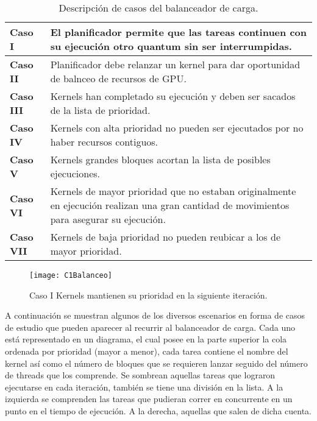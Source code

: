  \begin{table}[!]
      \begin{center}
            \footnotesize
        \begin{tabular}{|m{2cm}|m{8.5cm}|}
         \hline
         \cellcolor{lightgray}\textbf{Caso I} & El planificador permite que las tareas continuen con su ejecución otro quantum sin ser interrumpidas.\\ 
         \hline
          \cellcolor{lightgray}\textbf{Caso II} & Planificador debe relanzar un kernel para dar oportunidad de balnceo de recursos de GPU.\\ 
         \hline  
         \cellcolor{lightgray}\textbf{Caso III} & Kernels han completado su ejecución y deben ser sacados de la lista de prioridad.\\ 
         \hline
         \cellcolor{lightgray}\textbf{Caso IV} & Kernels con alta prioridad no pueden ser ejecutados por no haber recursos contiguos.\\ 
         \hline
         \cellcolor{lightgray}\textbf{Caso V} & Kernels grandes bloques acortan la lista de posibles ejecuciones.\\ 
         \hline
         \cellcolor{lightgray}\textbf{Caso VI} & Kernels de mayor prioridad que no estaban originalmente en ejecución realizan una gran cantidad de movimientos para asegurar su ejecución.\\ 
         \hline
         \cellcolor{lightgray}\textbf{Caso VII} & Kernels de baja prioridad no pueden reubicar a los de mayor prioridad.\\
         \hline
           \end{tabular}
        \caption{Descripción de casos del balanceador de carga.}
        \label{tab:Casos}
      \end{center}
    \end{table}
    

    \begin{figure}[!]
      \centering
        \texttt{[image: C1Balanceo]}
        \caption{Caso I Kernels mantienen su prioridad en la siguiente iteración.}
        \label{fig:C1Balanceo}
    \end{figure}

A continuación se muestran algunos de los diversos escenarios en forma de casos de estudio que pueden aparecer al recurrir al balanceador de carga. Cada uno está representado en un diagrama, el cual posee en la parte superior la cola ordenada por prioridad (mayor a menor), cada tarea contiene el nombre del kernel así como el número de bloques que se requieren lanzar seguido del número de threads que los comprende. Se sombrean aquellas tareas que lograron ejecutarse en cada iteración, también se tiene una división en la lista. A la izquierda se comprenden las tareas que pudieran correr en concurrente en un punto en el tiempo de ejecución. A la derecha, aquellas que salen de dicha cuenta.


